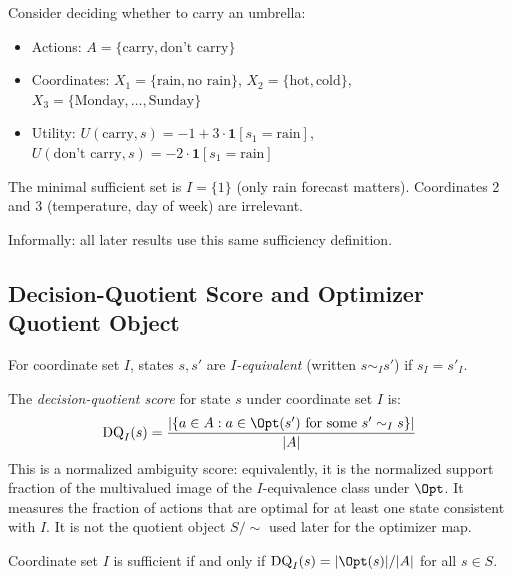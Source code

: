 \begin{example}
Consider deciding whether to carry an umbrella:
\begin{itemize}
\item Actions: $A = \{\text{carry}, \text{don't carry}\}$
\item Coordinates: $X_1 = \{\text{rain}, \text{no rain}\}$, $X_2 = \{\text{hot}, \text{cold}\}$, $X_3 = \{\text{Monday}, \ldots, \text{Sunday}\}$
\item Utility: $U(\text{carry}, s) = -1 + 3 \cdot \mathbf{1}[s_1 = \text{rain}]$, $U(\text{don't carry}, s) = -2 \cdot \mathbf{1}[s_1 = \text{rain}]$
\end{itemize}

The minimal sufficient set is $I = \{1\}$ (only rain forecast matters). Coordinates 2 and 3 (temperature, day of week) are irrelevant.
\end{example}

Informally: all later results use this same sufficiency definition.

\subsection{Decision-Quotient Score and Optimizer Quotient Object}

\begin{definition}\label{def:decision-equiv}
For coordinate set $I$, states $s, s'$ are \emph{$I$-equivalent} (written $s \sim_I s'$) if $s_I = s'_I$.
\end{definition}

\begin{definition}\label{def:decision-quotient}
The \emph{decision-quotient score} for state $s$ under coordinate set $I$ is:
\[
\text{DQ}_I(s) = \frac{|\{a \in A : a \in \Opt(s') \text{ for some } s' \sim_I s\}|}{|A|}
\]
This is a normalized ambiguity score: equivalently, it is the normalized support fraction of the multivalued image of the $I$-equivalence class under $\Opt$. It measures the fraction of actions that are optimal for at least one state consistent with $I$. It is not the quotient object $S/{\sim}$ used later for the optimizer map.
\end{definition}

\begin{proposition}\label{prop:sufficiency-char}
Coordinate set $I$ is sufficient if and only if $\text{DQ}_I(s) = |\Opt(s)|/|A|$ for all $s \in S$.
\end{proposition}

